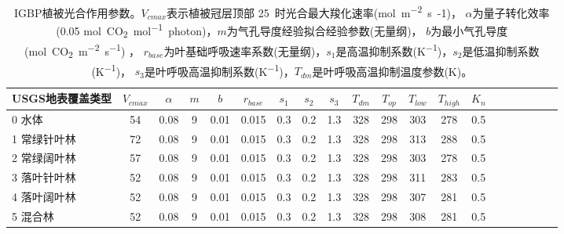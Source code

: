 \begin{landscape}
\begin{table}[htbp]
        \centering
        \caption{IGBP植被光合作用参数。$V_{cmax}$表示植被冠层顶部 25~\textcelsius 时光合最大羧化速率(\unit{mol.m^{-2}.s{-1}})，
        $\alpha$为量子转化效率(0.05 \unit{mol.CO_2.mol^{-1}.photon})，$m$为气孔导度经验拟合经验参数(无量纲)，
        $b$为最小气孔导度(\unit{mol.CO_2.m^{-2}.s^{-1}}) ，
        $r_{base}$为叶基础呼吸速率系数(无量纲)，$s_1$是高温抑制系数(\unit{K^{-1}})，$s_2$是低温抑制系数(\unit{K^{-1}})，
        $s_3$是叶呼吸高温抑制系数(\unit{K^{-1}})，$T_{dm}$是叶呼吸高温抑制温度参数(K)。}
        \label{tab:IGBP植被光合作用参数1}
        \begin{tabular}{@{}lccccccccccccccccccc@{}}
        \toprule
        USGS地表覆盖类型     &$ V_{cmax}$ & $\alpha$ & $m$& $b$ & $r_{base}$ & $s_1$ & $s_2$ & $s_3$ & $T_{dm}$ & $T_{op}$ & $T_{low}$ & $T_{high}$ & $K_n$  \\ \midrule
        0 水体          & 54 & 0.08 & 9 & 0.01 & 0.015 & 0.3 & 0.2 & 1.3 & 328 & 298 & 303 & 278 & 0.5 \\
        1 常绿针叶林       & 72          & 0.08          & 9          & 0.01          & 0.015          & 0.3          & 0.2          & 1.3          & 328          & 298          & 313          & 288          & 0.5          \\
        2 常绿阔叶林       & 57          & 0.08          & 9          & 0.01          & 0.015          & 0.3          & 0.2          & 1.3          & 328          & 298          & 303          & 278          & 0.5          \\
        3 落叶针叶林       & 52          & 0.08          & 9          & 0.01          & 0.015          & 0.3          & 0.2          & 1.3          & 328          & 298          & 311          & 283          & 0.5          \\
        4 落叶阔叶林       & 52          & 0.08          & 9          & 0.01          & 0.015          & 0.3          & 0.2          & 1.3          & 328          & 298          & 307          & 281          & 0.5          \\
        5 混合林         & 52          & 0.08          & 9          & 0.01          & 0.015          & 0.3          & 0.2          & 1.3          & 328          & 298          & 308          & 281          & 0.5          \\

\end{tabular}
\end{table}
\end{landscape}
